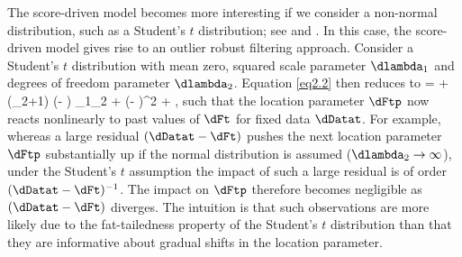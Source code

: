 The score-driven model becomes more interesting if we consider a non-normal distribution, such as a Student's $t$ distribution; see \citet{CKL2013} and \citet{harveyluati2014}. In this case, the score-driven model gives rise to an outlier robust filtering approach. Consider a Student's $t$ distribution with mean zero, squared scale parameter $\dlambda_1$ and degrees of freedom parameter $\dlambda_2$. Equation \eqref{eq2.2} then reduces to
    \dFtp = \domega + \dalpha\,
    (\dlambda_2+1) 
    \frac
    {(\dDatat - \dFt)}
    {\dlambda_1\dlambda_2 + (\dDatat - \dFt)^2}
    + \dbeta \dFt
    ,
\eq
such that the location parameter $\dFtp$ now reacts nonlinearly to past values of $\dFt$ for fixed data $\dDatat$. 
For example, whereas a large residual $(\dDatat-\dFt)$ pushes the next location parameter $\dFtp$ substantially up if the normal distribution is assumed ($\dlambda_2\to\infty$), under the Student's $t$ assumption the impact of such a large residual is of order $(\dDatat-\dFt)^{-1}$. The impact on $\dFtp$ therefore becomes negligible as $(\dDatat-\dFt)$ diverges. The intuition is that such observations are more likely due to the fat-tailedness property of the Student's $t$ distribution than that they are informative about gradual shifts in the location parameter.


